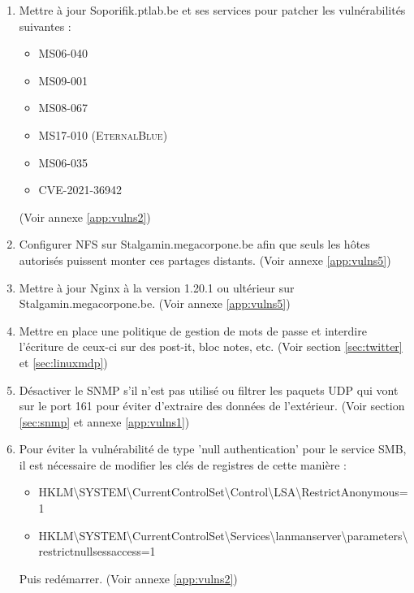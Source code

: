 \documentclass[a4paper]{article}
\begin{document}
\begin{enumerate}

    \item Mettre à jour Soporifik.ptlab.be et ses services pour patcher les vulnérabilités suivantes :
    \begin{itemize}
        \item MS06-040
        \item MS09-001
        \item MS08-067
        \item MS17-010 (\textsc{EternalBlue})
        \item MS06-035
        \item CVE-2021-36942
    \end{itemize}
    (Voir annexe \ref{app:vulns2})
    
    \item Configurer NFS sur Stalgamin.megacorpone.be afin que seuls les hôtes autorisés puissent monter ces partages distants. (Voir annexe \ref{app:vulns5})
    
    \item Mettre à jour Nginx à la version 1.20.1 ou ultérieur sur Stalgamin.megacorpone.be. (Voir annexe \ref{app:vulns5})
    
    \item Mettre en place une politique de gestion de mots de passe et interdire l'écriture de ceux-ci sur des post-it, bloc notes, etc. (Voir section \ref{sec:twitter} et \ref{sec:linuxmdp})
    
     \item Désactiver le SNMP s'il n'est pas utilisé ou filtrer les paquets UDP qui vont sur le port 161 pour éviter d'extraire des données de l'extérieur. (Voir section \ref{sec:snmp} et annexe \ref{app:vulns1})
    
    \item Pour éviter la vulnérabilité de type 'null authentication' pour le service SMB, il est nécessaire de modifier les clés de registres de cette manière :
    \begin{itemize}
        \item HKLM\textbackslash SYSTEM\textbackslash CurrentControlSet\textbackslash Control\textbackslash LSA\textbackslash RestrictAnonymous=1
        \item HKLM\textbackslash SYSTEM\textbackslash CurrentControlSet\textbackslash Services\textbackslash lanmanserver\textbackslash parameters\textbackslash restrictnullsessaccess=1
    \end{itemize}
    Puis redémarrer. (Voir annexe \ref{app:vulns2})
    

\end{enumerate}
\end{document}
